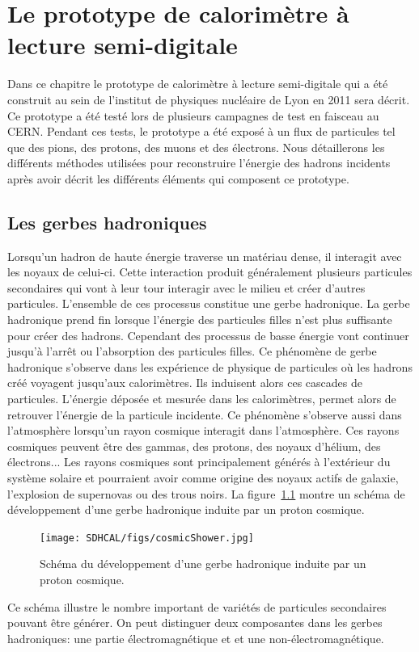 \chapter{Le prototype de calorimètre à lecture semi-digitale}
\label{chap.sdhcal}
Dans ce chapitre le prototype de calorimètre à lecture semi-digitale qui a été construit au sein de l’institut de physiques nucléaire de Lyon en 2011 sera décrit. Ce prototype a été testé lors de plusieurs campagnes de test en faisceau au CERN. Pendant ces tests, le prototype a été exposé à un flux de particules tel que des pions, des protons, des muons et des électrons. Nous détaillerons les différents méthodes utilisées pour reconstruire l’énergie des hadrons incidents après avoir décrit les différents éléments qui composent ce prototype. 
\minitoc
\newpage


\section{Les gerbes hadroniques}
Lorsqu'un hadron de haute énergie traverse un matériau dense, il interagit avec les noyaux de celui-ci. Cette interaction produit généralement plusieurs particules secondaires qui vont à leur tour interagir avec le milieu et créer d'autres particules. L'ensemble de ces processus constitue une gerbe hadronique.  La gerbe hadronique prend fin lorsque l'énergie des particules filles n'est plus suffisante pour créer des hadrons. Cependant des processus de basse énergie vont continuer jusqu'à l'arrêt ou l'absorption des particules filles. Ce phénomène de gerbe hadronique s'observe dans les expérience de physique de particules où les hadrons créé voyagent jusqu'aux calorimètres. Ils induisent alors ces cascades de particules. L'énergie déposée et mesurée dans les calorimètres, permet alors de retrouver l'énergie de la particule incidente. Ce phénomène s'observe aussi dans l'atmosphère lorsqu'un rayon cosmique interagit dans l'atmosphère. Ces rayons cosmiques peuvent être des gammas, des protons, des noyaux d'hélium, des électrons... Les rayons cosmiques sont principalement générés à l'extérieur du système solaire et pourraient avoir comme origine des noyaux actifs de galaxie, l'explosion de supernovas ou des trous noirs. La figure~\ref{fig:cosmicShowerScheme} montre un schéma de développement d'une gerbe hadronique induite par un proton cosmique.
\begin{figure}[!h]
  \begin{center}
    \texttt{[image: SDHCAL/figs/cosmicShower.jpg]}
    \caption{Schéma du développement d'une gerbe hadronique induite par un proton cosmique.}
    \label{fig:cosmicShowerScheme}
  \end{center}
\end{figure}
Ce schéma illustre le nombre important de variétés de particules secondaires pouvant être générer. 
On peut distinguer deux composantes dans les gerbes hadroniques: une partie électromagnétique et et une non-électromagnétique.\\

